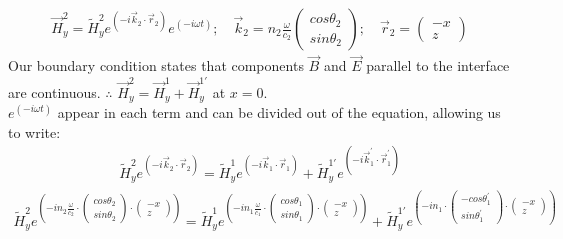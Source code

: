 \documentclass{article}
\begin{document}
\begin{align}
\vec{H}_{y}^{2} = \tilde{H}_{y}^{2} e^{\left( -i \vec{k}_{2} \cdot \vec{r}_{2} \right)} e^ {\left(-i \omega t \right)}; \quad 
\vec{k}_{2} = n_{2} \frac{\omega}{c_{2}} 
\begin{pmatrix}
	cos{\theta_{2}} \\
	sin{\theta_{2}}
\end{pmatrix}; \quad
\vec{r}_{2} = 
\begin{pmatrix}
	-x \\
	z
\end{pmatrix}
\end{align}
Our boundary condition states that components $\vec{B}$ and $\vec{E}$ parallel to the interface are continuous. $\therefore$ $\vec{H}_{y}^{2} = \vec{H}_{y}^{1} + \vec{H}_{y}^{1'}$ at $x = 0$. \\

$e^ {\left(-i \omega t \right)}$ appear in each term and can be divided out of the equation, allowing us to write:
\begin{align}
\tilde{H}_{y}^{2} e^{\left( -i \vec{k}_{2} \cdot \vec{r}_{2} \right)} = \tilde{H}_{y}^{1} e^{\left( -i \vec{k}_{1} \cdot \vec{r}_{1} \right)} + \tilde{H}_{y}^{1'} e^{\left( -i \vec{k}_{1}^{'} \cdot \vec{r}_{1}^{'} \right)}
\end{align}
\begin{align}
\tilde{H}_{y}^{2} e^{\left( -i n_{2} \frac{\omega}{c_2} \cdot \begin{pmatrix}
	cos{\theta_{2}} \\
	sin{\theta_{2}}
\end{pmatrix} \cdot \begin{pmatrix}
	-x \\
	z
\end{pmatrix}
\right)} = \tilde{H}_{y}^{1} e^{\left( -i n_{1} \frac{\omega}{c_1} \cdot \begin{pmatrix}
	cos{\theta_{1}} \\
	sin{\theta_{1}} 
\end{pmatrix} \cdot \begin{pmatrix}
	-x \\
	z
\end{pmatrix}\right)} + \tilde{H}_{y}^{1'} e^{\left( -i n_{1} \cdot \begin{pmatrix}
	-cos{\theta_{1}^{'}} \\
	sin{\theta_{1}^{'}} 
\end{pmatrix} \cdot \begin{pmatrix}
	-x \\
	z
\end{pmatrix}
\right)}
\end{align}
\end{document}
